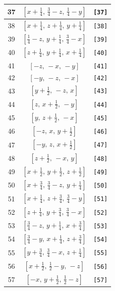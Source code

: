 \documentclass[fleqn,8pt]{jsarticle}
\begin{document}
\begin{longtable}{ccc}
37 & $\left[ x + \frac{1}{4},\, \frac{3}{4} - z,\, \frac{1}{4} - y \right]$ & {\tt [37]} \\ \hline
38 & $\left[ x + \frac{1}{4},\, z + \frac{1}{4},\, y + \frac{1}{4} \right]$ & {\tt [38]} \\ \hline
39 & $\left[ \frac{1}{4} - z,\, y + \frac{1}{4},\, \frac{3}{4} - x \right]$ & {\tt [39]} \\ \hline
40 & $\left[ z + \frac{1}{4},\, y + \frac{1}{4},\, x + \frac{1}{4} \right]$ & {\tt [40]} \\ \hline
41 & $\left[ - z,\, - x,\, - y \right]$ & {\tt [41]} \\ \hline
42 & $\left[ - y,\, - z,\, - x \right]$ & {\tt [42]} \\ \hline
43 & $\left[ y + \frac{1}{2},\, - z,\, x \right]$ & {\tt [43]} \\ \hline
44 & $\left[ z,\, x + \frac{1}{2},\, - y \right]$ & {\tt [44]} \\ \hline
45 & $\left[ y,\, z + \frac{1}{2},\, - x \right]$ & {\tt [45]} \\ \hline
46 & $\left[ - z,\, x,\, y + \frac{1}{2} \right]$ & {\tt [46]} \\ \hline
47 & $\left[ - y,\, z,\, x + \frac{1}{2} \right]$ & {\tt [47]} \\ \hline
48 & $\left[ z + \frac{1}{2},\, - x,\, y \right]$ & {\tt [48]} \\ \hline
49 & $\left[ x + \frac{1}{2},\, y + \frac{1}{2},\, z + \frac{1}{2} \right]$ & {\tt [49]} \\ \hline
50 & $\left[ x + \frac{3}{4},\, \frac{3}{4} - z,\, y + \frac{1}{4} \right]$ & {\tt [50]} \\ \hline
51 & $\left[ x + \frac{1}{4},\, z + \frac{3}{4},\, \frac{3}{4} - y \right]$ & {\tt [51]} \\ \hline
52 & $\left[ z + \frac{1}{4},\, y + \frac{3}{4},\, \frac{3}{4} - x \right]$ & {\tt [52]} \\ \hline
53 & $\left[ \frac{3}{4} - z,\, y + \frac{1}{4},\, x + \frac{3}{4} \right]$ & {\tt [53]} \\ \hline
54 & $\left[ \frac{3}{4} - y,\, x + \frac{1}{4},\, z + \frac{3}{4} \right]$ & {\tt [54]} \\ \hline
55 & $\left[ y + \frac{3}{4},\, \frac{3}{4} - x,\, z + \frac{1}{4} \right]$ & {\tt [55]} \\ \hline
56 & $\left[ x + \frac{1}{2},\, \frac{1}{2} - y,\, - z \right]$ & {\tt [56]} \\ \hline
57 & $\left[ - x,\, y + \frac{1}{2},\, \frac{1}{2} - z \right]$ & {\tt [57]} \\ \hline

\end{longtable}
\end{document}
